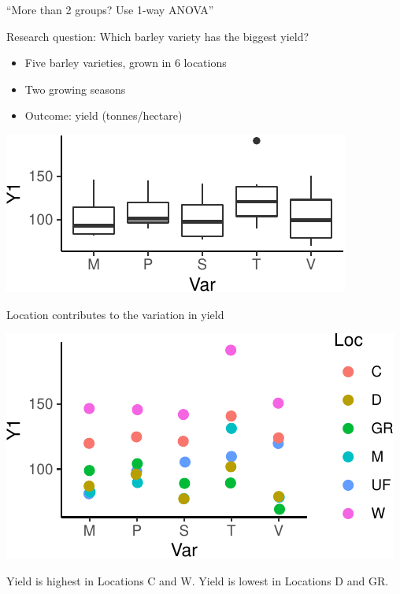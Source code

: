 \documentclass[
  12pt,
  ignorenonframetext,
  aspectratio=169,
]{beamer}
\providecommand{\tightlist}{%
  \setlength{\itemsep}{0pt}\setlength{\parskip}{0pt}}
\begin{document}
\begin{frame}{``More than 2 groups? Use 1-way ANOVA''}
\protect\hypertarget{more-than-2-groups-use-1-way-anova}{}

Research question: Which barley variety has the biggest yield?

\begin{itemize}
\tightlist
\item
  Five barley varieties, grown in 6 locations
\item
  Two growing seasons
\item
  Outcome: yield (tonnes/hectare)
\end{itemize}

\begin{center}\includegraphics{Lecture-1_files/figure-beamer/unnamed-chunk-7-1} \end{center}

\end{frame}

\begin{frame}{Location contributes to the variation in yield}
\protect\hypertarget{location-contributes-to-the-variation-in-yield}{}

\begin{center}\includegraphics{Lecture-1_files/figure-beamer/unnamed-chunk-8-1} \end{center}

Yield is highest in Locations C and W. Yield is lowest in Locations D
and GR.

\end{frame}
\end{document}
